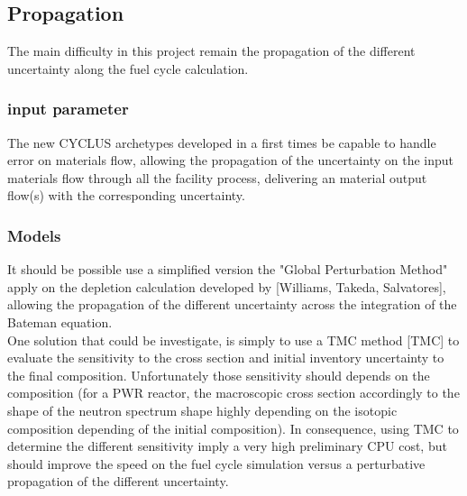 \documentclass[dvips,12pt]{article}
\begin{document}
\subsection{Propagation} 
The main difficulty in this project remain the propagation of the different uncertainty along the fuel cycle calculation.
\subsubsection{input parameter}
The new CYCLUS archetypes developed in a first times be capable to handle error on materials flow, allowing the propagation of the uncertainty on the input materials flow through all the facility process, delivering an material output flow(s) with the corresponding uncertainty.


\subsubsection{Models}
It should be possible use a simplified version the "Global Perturbation Method"  apply on the depletion calculation developed by [Williams, Takeda, Salvatores], allowing the propagation of the different uncertainty across the integration of the Bateman equation.\\
One solution that could be investigate, is simply to use a TMC method [TMC] to evaluate the sensitivity to the cross section and initial inventory uncertainty to the final composition. Unfortunately those sensitivity should depends on the composition (for a PWR reactor, the macroscopic cross section accordingly to the shape of the neutron spectrum shape highly depending on the isotopic composition depending of the initial composition). In consequence, using TMC to determine the different sensitivity imply a very high preliminary CPU cost, but should improve the speed on the fuel cycle simulation versus a perturbative propagation of the different uncertainty.\\
\end{document}
